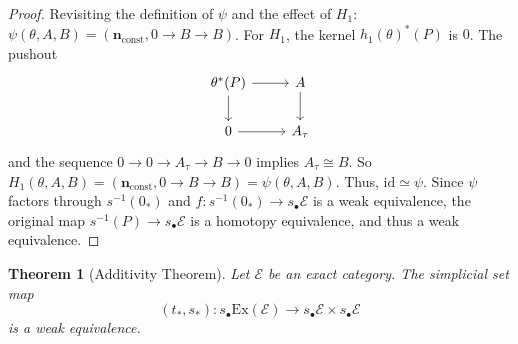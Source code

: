 \documentclass[12pt]{report}
\numberwithin{equation}{section}
\newtheorem{theorem}[dummy]{Theorem}
\begin{document}
\begin{proof}
	Revisiting the definition of $\psi$ and the effect of $H_1$:
	$\psi(\theta, A, B) = (\mathbf{n}_{\text{const}}, 0 \to B \to B)$.
	For $H_1$, the kernel $h_1(\theta)^*(P)$ is $0$. The pushout
\[\begin{tikzcd}
	{\theta^*(P)} & A \\
	0 & {A_\tau}
	\arrow[from=1-1, to=1-2]
	\arrow[from=1-1, to=2-1]
	\arrow[from=1-2, to=2-2]
	\arrow[from=2-1, to=2-2]
\end{tikzcd}\]
	and the sequence $0 \to 0 \to A_\tau \to B \to 0$ implies $A_\tau \cong B$.
	So $H_1(\theta, A, B) = (\mathbf{n}_{\text{const}}, 0 \to B \to B) = \psi(\theta, A, B)$.
	Thus, $\mathrm{id} \simeq \psi$. Since $\psi$ factors through $s^{-1}(0_*)$ and $f: s^{-1}(0_*) \to s_{\bullet}\mathcal{E}$ is a weak equivalence, the original map $s^{-1}(P) \to s_{\bullet}\mathcal{E}$ is a homotopy equivalence, and thus a weak equivalence.
\end{proof}


\begin{theorem}[Additivity Theorem]
	\label{thm:Additivity_manual_proper_no_id_cmd_generic_label_v2}
	Let $\mathcal{E}$ be an exact category. The simplicial set map
	\[ (t_*, s_*) : s_{\bullet}\mathrm{Ex}(\mathcal{E}) \to s_{\bullet}\mathcal{E} \times s_{\bullet}\mathcal{E} \]
	is a weak equivalence.
\end{theorem}
\end{document}
